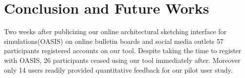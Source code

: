 \chapter{Conclusion and Future Works} \label{sec:con}


	Two weeks after publicizing our online architectural sketching interface for simulations(OASIS) on online bulletin boards and social media outlets 57 participants registered accounts on our tool.
	Despite taking the time to register with OASIS, 26 participants ceased using our tool immediately after.
	Moreover only 14 users readily provided quantitative feedback for our pilot user study.











